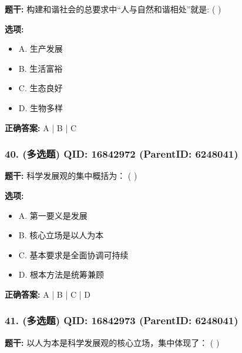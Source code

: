 \documentclass[12pt,UTF8]{ctexart}
\begin{document}
\textbf{题干:}
构建和谐社会的总要求中“人与自然和谐相处”就是: ( )



\textbf{选项:}
\begin{itemize}[leftmargin=*]

  \item A. 生产发展

  \item B. 生活富裕

  \item C. 生态良好

  \item D. 生物多样

\end{itemize}

\textbf{正确答案:}
A | B | C

\vspace{0.3em}\hrulefill\vspace{0.7em}

\subsubsection*{40. (多选题) \small QID: 16842972 (ParentID: 6248041)}

\textbf{题干:}
科学发展观的集中概括为： ( )



\textbf{选项:}
\begin{itemize}[leftmargin=*]

  \item A. 第一要义是发展

  \item B. 核心立场是以人为本

  \item C. 基本要求是全面协调可持续

  \item D. 根本方法是统筹兼顾

\end{itemize}

\textbf{正确答案:}
A | B | C | D

\vspace{0.3em}\hrulefill\vspace{0.7em}

\subsubsection*{41. (多选题) \small QID: 16842973 (ParentID: 6248041)}

\textbf{题干:}
以人为本是科学发展观的核心立场，集中体现了： ( )
\end{document}
